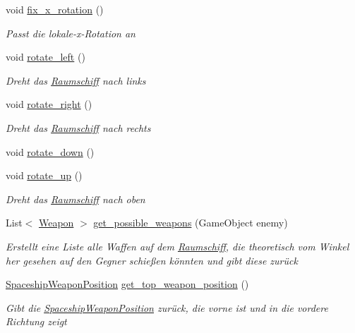 \begin{DoxyCompactItemize}
void \hyperlink{class_spaceship_af4e61eb0614f6933afff28f8f12bbdb9}{fix\+\_\+x\+\_\+rotation} ()
\begin{DoxyCompactList}\small\item\em Passt die lokale-\/x-\/\+Rotation an \end{DoxyCompactList}\item 
void \hyperlink{class_spaceship_a0b021ca84c90939591bb5068542c1dde}{rotate\+\_\+left} ()
\begin{DoxyCompactList}\small\item\em Dreht das \hyperlink{class_raumschiff}{Raumschiff} nach links \end{DoxyCompactList}\item 
void \hyperlink{class_spaceship_adaa371fa37ba5b564b15a35b3ff94437}{rotate\+\_\+right} ()
\begin{DoxyCompactList}\small\item\em Dreht das \hyperlink{class_raumschiff}{Raumschiff} nach rechts \end{DoxyCompactList}\item 
void \hyperlink{class_spaceship_a1f8779409140a15e00f3cb4b5c7bec14}{rotate\+\_\+down} ()
\item 
void \hyperlink{class_spaceship_a311d6c40b0c54f11a2da4624a5e2487c}{rotate\+\_\+up} ()
\begin{DoxyCompactList}\small\item\em Dreht das \hyperlink{class_raumschiff}{Raumschiff} nach oben \end{DoxyCompactList}\item 
List$<$ \hyperlink{class_weapon}{Weapon} $>$ \hyperlink{class_spaceship_aa55156010da7dba1748429efda244d04}{get\+\_\+possible\+\_\+weapons} (Game\+Object enemy)
\begin{DoxyCompactList}\small\item\em Erstellt eine Liste alle Waffen auf dem \hyperlink{class_raumschiff}{Raumschiff}, die theoretisch vom Winkel her gesehen auf den Gegner schießen könnten und gibt diese zurück \end{DoxyCompactList}\item 
\hyperlink{class_spaceship_weapon_position}{Spaceship\+Weapon\+Position} \hyperlink{class_spaceship_abe7281c6b8a4d3e9294c56e6a1cf8157}{get\+\_\+top\+\_\+weapon\+\_\+position} ()
\begin{DoxyCompactList}\small\item\em Gibt die \hyperlink{class_spaceship_weapon_position}{Spaceship\+Weapon\+Position} zurück, die vorne ist und in die vordere Richtung zeigt \end{DoxyCompactList}\item 

\end{DoxyCompactItemize}
